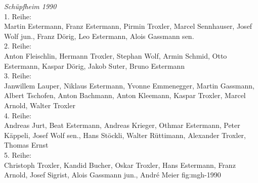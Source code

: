 {\emph{Schüpfheim 1990}\\
    1. Reihe:\\
    Martin Estermann, Franz Estermann, Pirmin Troxler, Marcel Sennhauser, Josef
    Wolf jun., Franz Dörig, Leo Estermann, Alois Gassmann sen.\\
    2. Reihe:\\
    Anton Fleischlin, Hermann Troxler, Stephan Wolf, Armin Schmid, Otto
    Estermann, Kaspar Dörig, Jakob Suter, Bruno Estermann\\
    3. Reihe:\\
    Janwillem Lauper, Niklaus Estermann, Yvonne Emmenegger, Martin Gassmann,
    Albert Tschofen, Anton Bachmann, Anton Kleemann, Kaspar Troxler, Marcel
    Arnold, Walter Troxler\\
    4. Reihe:\\
    Andreas Jurt, Beat Estermann, Andreas Krieger, Othmar Estermann, Peter
    Käppeli, Josef Wolf sen., Hans Stöckli, Walter Rüttimann, Alexander Troxler,
    Thomas Ernst\\
    5. Reihe:\\
    Christoph Troxler, Kandid Bucher, Oskar Troxler, Hans Estermann, Franz
    Arnold, Josef Sigrist, Alois Gassmann jun., André Meier } {fig:mgh-1990}

\clearpage

